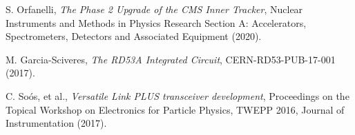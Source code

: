 \documentclass[a4paper,11pt]{article}
\begin{document}
\begin{thebibliography}{99}
S. Orfanelli, \emph{The Phase 2 Upgrade of the CMS Inner Tracker},
Nuclear Instruments and Methods in Physics Research Section A: Accelerators, Spectrometers, Detectors and Associated Equipment (2020).

%

M. Garcia-Sciveres, \emph{The RD53A Integrated Circuit},
CERN-RD53-PUB-17-001 (2017).

%

C. So{\'{o}}s, et al., \emph{Versatile Link {PLUS} transceiver development},
Proceedings on the Topical Workshop on Electronics for Particle Physics, TWEPP 2016,
Journal of Instrumentation (2017).



\end{thebibliography}
\end{document}
